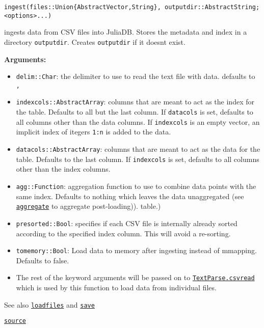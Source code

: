 \documentclass{memoir}
\begin{document}
\begin{adjustwidth}{2em}{0pt}


\begin{lstlisting}
ingest(files::Union{AbstractVector,String}, outputdir::AbstractString; <options>...)
\end{lstlisting}

ingests data from CSV files into JuliaDB. Stores the metadata and index in a directory \texttt{outputdir}. Creates \texttt{outputdir} if it doesn{\textquotesingle}t exist.

\textbf{Arguments:}

\begin{itemize}
\item \texttt{delim::Char}: the delimiter to use to read the text file with data. defaults to \texttt{,}


\item \texttt{indexcols::AbstractArray}: columns that are meant to act as the index for the table.  Defaults to all but the last column. If \texttt{datacols} is set, defaults to all  columns other than the data columns. If \texttt{indexcols} is an empty vector,  an implicit index of itegers \texttt{1:n} is added to the data.


\item \texttt{datacols::AbstractArray}: columns that are meant to act as the data for the table.  Defaults to the last column. If \texttt{indexcols} is set, defaults to all  columns other than the index columns.


\item \texttt{agg::Function}: aggregation function to use to combine data points with the same index. Defaults to nothing which leaves the data unaggregated (see \href{apireference.html\#IndexedTables.aggregate-Tuple\{Any,JuliaDB.DTable\}}{\texttt{aggregate}} to aggregate post-loading)).  table.)


\item \texttt{presorted::Bool}: specifies if each CSV file is internally already sorted according  to the specified index column. This will avoid a re-sorting.


\item \texttt{tomemory::Bool}: Load data to memory after ingesting instead of mmapping. Defaults to false.


\item The rest of the keyword arguments will be passed on to \href{@ref}{\texttt{TextParse.csvread}} which is used by this function to load data from individual files.

\end{itemize}
See also \href{tutorial.html\#JuliaDB.loadfiles}{\texttt{loadfiles}} and \href{tutorial.html\#JuliaDB.save}{\texttt{save}}



\href{https://github.com/JuliaComputing/JuliaDB.jl/tree/9e65f8c3b0e9c2e27c3334a093a5aefc6c7d1246/src/ingest.jl#L5-L29}{\texttt{source}}


\end{adjustwidth}
\end{document}
